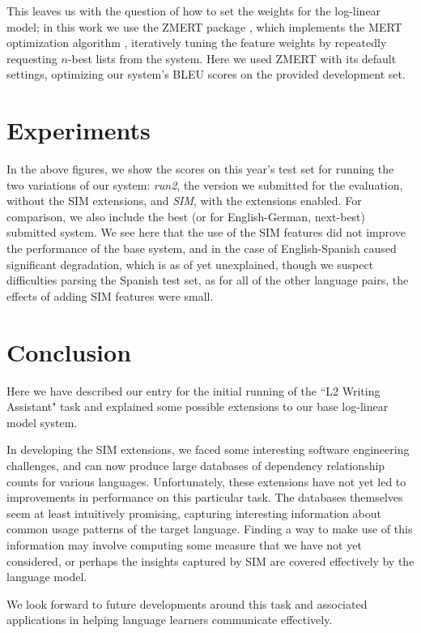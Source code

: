 \documentclass[11pt]{article}
\begin{document}
This leaves us with the question of how to set the weights for the log-linear
model; in this work we use the ZMERT package \cite{zaidan:zmert:09}, which
implements the MERT optimization algorithm \cite{och:2003:ACL}, iteratively
tuning the feature weights by repeatedly requesting $n$-best lists from the
system. Here we used ZMERT with its default settings, optimizing our system's
BLEU scores on the provided development set.

\section{Experiments}
\label{sec:exp}

In the above figures, we show the scores on this year's test set for running
the two variations of our system: \emph{run2}, the version we submitted for the
evaluation, without the SIM extensions, and \emph{SIM}, with the extensions
enabled. For comparison, we also include the best (or for English-German,
next-best) submitted system.
We see here that the use of the SIM features did not improve the performance of
the base system, and in the case of English-Spanish caused significant
degradation, which is as of yet unexplained, though we suspect difficulties
parsing the Spanish test set, as for all of the other language pairs, the
effects of adding SIM features were small.

\section{Conclusion} 
Here we have described our entry for the initial running of the ``L2 Writing
Assistant" task and explained some possible extensions to our base log-linear
model system.

In developing the SIM extensions, we faced some interesting software
engineering challenges, and can now produce large databases of dependency
relationship counts for various languages. Unfortunately, these extensions have
not yet led to improvements in performance on this particular task. The
databases themselves seem at least intuitively promising, capturing interesting
information about common usage patterns of the target language.
Finding a way to make use of this information may involve computing some
measure that we have not yet considered, or perhaps the insights captured by
SIM are covered effectively by the language model.

We look forward to future developments around this task and associated
applications in helping language learners communicate effectively.

\clearpage


\end{document}

